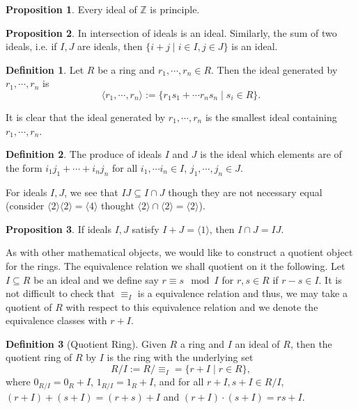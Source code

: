 \documentclass[]{article}
\theoremstyle{definition}
\theoremstyle{definition}
\newtheorem{definition}{Definition}[section]
\newtheorem{proposition}{Proposition}[section]
\begin{document}
\begin{proposition}
  Every ideal of \(\mathbb{Z}\) is principle.
\end{proposition}

\begin{proposition}
  In intersection of ideals is an ideal. Similarly, the sum of two ideals, 
  i.e. if \(I, J\) are ideals, then \(\{i + j \mid i \in I, j \in J\}\) is an 
  ideal.
\end{proposition}

\begin{definition}
  Let \(R\) be a ring and \(r_1, \cdots, r_n \in R\). Then the ideal generated 
  by \(r_1, \cdots, r_n\) is 
  \[\langle r_1, \cdots, r_n \rangle := 
    \{r_1 s_1 + \cdots r_n s_n \mid s_i \in R\}.\]
\end{definition}

It is clear that the ideal generated by \(r_1, \cdots, r_n\) is the smallest 
ideal containing \(r_1, \cdots, r_n\).

\begin{definition}
  The produce of ideals \(I\) and \(J\) is the ideal which elements are
  of the form \(i_1j_1 + \cdots + i_nj_n\) for all \(i_1, \cdots i_n \in I\), 
  \(j_1, \cdots, j_n \in J\).
\end{definition}

For ideals \(I, J\), we see that \(IJ \subseteq I \cap J\) though they are not 
necessary equal (consider \(\langle 2 \rangle \langle 2 \rangle = \langle 4 
\rangle\) thought \(\langle 2 \rangle \cap \langle 2 \rangle = \langle 2 \rangle\)).

\begin{proposition}
  If ideals \(I, J\) satisfy \(I + J = \langle 1 \rangle\), then 
  \(I \cap J = IJ\).
\end{proposition}

As with other mathematical objects, we would like to construct a quotient 
object for the rings. The equivalence relation we shall quotient on it the 
following. Let \(I \subseteq R\) be an ideal and we define say
\(r \equiv s \mod I\) for \(r, s \in R\) if \(r - s \in I\). It is not difficult 
to check that \(\equiv_I\) is a equivalence relation and thus, we may take 
a quotient of \(R\) with respect to this equivalence relation and we denote 
the equivalence classes with \(r + I\).

\begin{definition}[Quotient Ring]
  Given \(R\) a ring and \(I\) an ideal of \(R\), then the quotient ring 
  of \(R\) by \(I\) is the ring with the underlying set 
  \[R / I := R / \equiv_I = \{r + I \mid r \in R\},\]
  where \(0_{R/I} = 0_R + I\), \(1_{R/I} = 1_R + I\), and for all 
  \(r + I, s + I \in R / I\), \((r + I) + (s + I) = (r + s) + I\) 
  and \((r + I) \cdot (s + I) = rs + I\).
\end{definition}
\end{document}
